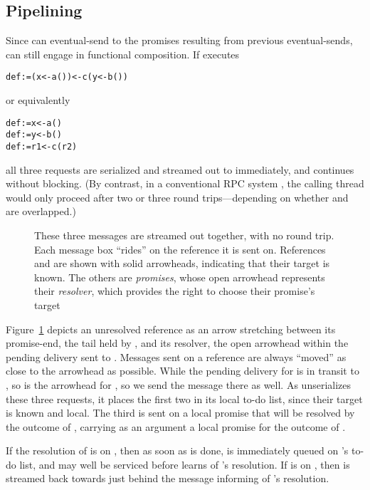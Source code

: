 \documentclass{llncs}
\begin{document}
\subsection{Pipelining}

Since  can eventual-send to the promises resulting from
previous eventual-sends,  can still engage in functional
composition. If  executes
%
\begin{alltt}
    def  := (x <- a()) <- c(y <- b())
\end{alltt}
%
or equivalently
%
\begin{alltt}
    def  := x <- a()
    def  := y <- b()
    def  := r1 <- c(r2)
\end{alltt}
%
all three requests are serialized and streamed out to 
immediately, and  continues without blocking. (By contrast, in
a conventional RPC system
\cite{Nelson81,java:rmi,corba:latency,xml-rpc:latency}, the calling
thread would only proceed after two or three round trips---depending
on whether  and  are overlapped.)

\begin{figure}
\centerline{}
\caption{These three messages are streamed out together, with no round
  trip. Each message box ``rides'' on the reference it is sent
  on. References  and  are shown with solid arrowheads,
  indicating that their target is known. The others are
  \emph{promises}, whose open arrowhead represents their
  \emph{resolver}, which provides the right to choose their promise's
  target}
\label{fig:pipeline}
\end{figure}

Figure~\ref{fig:pipeline} depicts an unresolved reference as an arrow
stretching between its promise-end, the tail held by , and its
resolver, the open arrowhead within the pending delivery sent to
. Messages sent on a reference are always ``moved'' as close to
the arrowhead as possible. While the pending delivery for 
is in transit to , so is the arrowhead for , so we send
the  message there as well. As  unserializes these
three requests, it places the first two in its local to-do list, since
their target is known and local. The third is sent on a local promise
that will be resolved by the outcome of , carrying as an
argument a local promise for the outcome of .

If the resolution of  is on , then as soon as
 is done,  is immediately queued on 's
to-do list, and may well be serviced before  learns of
's resolution. If  is on , then  is
streamed back towards  just behind the message informing
 of 's resolution.
\end{document}
